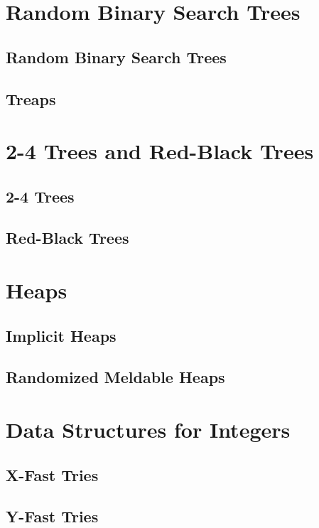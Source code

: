 \documentclass{book}
\begin{document}
\chapter{Random Binary Search Trees}
\section{Random Binary Search Trees}
\section{Treaps}

\chapter{2-4 Trees and Red-Black Trees}
\section{2-4 Trees}
\section{Red-Black Trees}

\chapter{Heaps}
\section{Implicit Heaps}
\section{Randomized Meldable Heaps}

\chapter{Data Structures for Integers}
\section{X-Fast Tries}
\section{Y-Fast Tries}
\end{document}
